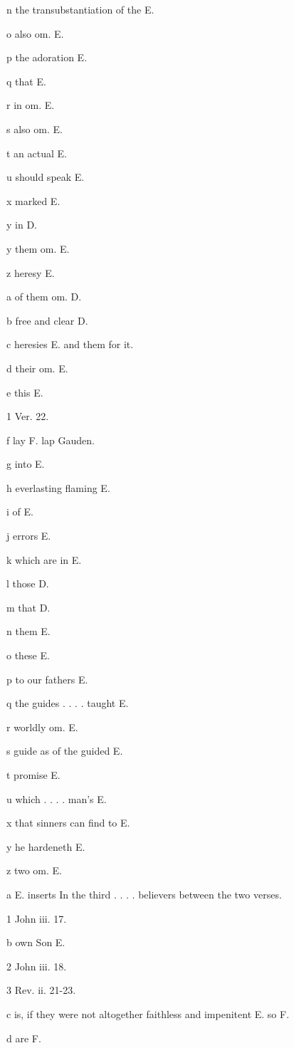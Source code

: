 n
the transubstantiation of the E.

o
also om. E.

p
the adoration E.

q
that E.

r
in om. E.

s
also om. E.

t
an actual E.

u
should speak E.

x
marked E.

y
in D.

y
them om. E.

z
heresy E.

a
of them om. D.

b
free and clear D.

c
heresies E. and them for it.

d
their om. E.

e
this E.

1
Ver. 22.

f
lay F. lap Gauden.

g
into E.

h
everlasting flaming E.

i
of E.

j
errors E.

k
which are in E.

l
those D.

m
that D.

n
them E.

o
these E.

p
to our fathers E.

q
the guides . . . . taught E.

r
worldly om. E.

s
guide as of the guided E.

t
promise E.

u
which . . . . man’s E.

x
that sinners can find to E.

y
he hardeneth E.

z
two om. E.

a
E. inserts In the third . . . . believers between the two verses.

1
John iii. 17.

b
own Son E.

2
John iii. 18.

3
Rev. ii. 21-23.

c
is, if they were not altogether faithless and impenitent E. so F.

d
are F.

